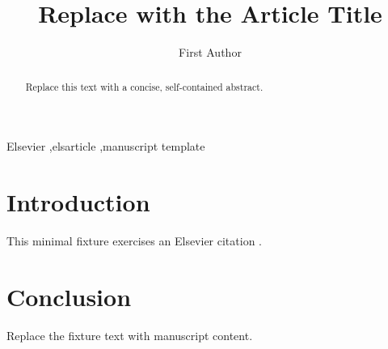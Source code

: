 \documentclass[preprint,12pt]{elsarticle}
\begin{document}
\begin{frontmatter}

\title{Replace with the Article Title}

\author[inst1]{First Author}
\address[inst1]{Department, Institution, City, Country}

\begin{abstract}
Replace this text with a concise, self-contained abstract.
\end{abstract}

\begin{keyword}
Elsevier \sep elsarticle \sep manuscript template
\end{keyword}

\end{frontmatter}

\section{Introduction}
This minimal fixture exercises an Elsevier citation \citep{lamport1994latex}.

\section{Conclusion}
Replace the fixture text with manuscript content.



\end{document}
